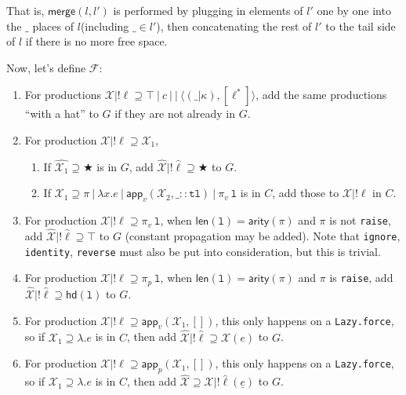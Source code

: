 \documentclass[a4paper]{article}
\newcommand*\vbar{|}
\begin{document}
That is, $\mathsf{merge}(l,l')$ is performed by plugging in elements of $l'$ one by one into the $\_$ places of $l$(including $\_\in l'$), then concatenating the rest of $l'$ to the tail side of $l$ if there is no more free space.

Now, let's define $\mathcal{F}$:

\begin{enumerate}
    \item For productions $\mathcal{X}\vbar!\ell\supseteq\top\:\vbar\: c\:\vbar\:\vbar\:\langle(\_\vbar\kappa),[\ell^*]\rangle$, add the same productions ``with a hat'' to $G$ if they are not already in $G$.
    \item For production $\mathcal{X}\vbar!\ell\supseteq\mathcal{X_1}$,
    \begin{enumerate}
        \item If $\hat{\mathcal{X_1}}\supseteq\bigstar$ is in $G$, add $\hat{\mathcal{X}}\vbar!\hat{\ell}\supseteq\bigstar$ to $G$.
        \item If $\mathcal{X}_1\supseteq \pi\:\vbar\:\lambda x.e\:\vbar\:\mathsf{app}_v(\mathcal{X}_2,\_::\mathtt{tl})\:\vbar\:\pi_v\:\mathtt{l}$ is in $C$, add those to $\mathcal{X}\vbar!\ell$ in $C$.
    \end{enumerate}
    \item For production $\mathcal{X}\vbar!\ell\supseteq\pi_v\:\mathtt{l}$, when $\mathsf{len}(\mathtt{l})=\mathsf{arity}(\pi)$ and $\pi$ is not \texttt{raise}, add $\hat{\mathcal{X}}\vbar!\hat{\ell}\supseteq\top$ to $G$ (constant propagation may be added). Note that \texttt{ignore}, \texttt{identity}, \texttt{reverse} must also be put into consideration, but this is trivial.
    \item For production $\mathcal{X}\vbar!\ell\supseteq\pi_p\:\mathtt{l}$, when $\mathsf{len}(\mathtt{l})=\mathsf{arity}(\pi)$ and $\pi$ is \texttt{raise}, add $\hat{\mathcal{X}}\vbar!\hat{\ell}\supseteq\mathsf{hd}(\mathtt{l})$ to $G$.
    \item For production $\mathcal{X}\vbar!\ell\supseteq\mathsf{app}_v(\mathcal{X_1},[])$, this only happens on a \texttt{Lazy.force}, so if $\mathcal{X_1}\supseteq\lambda.e$ is in $C$, then add $\hat{\mathcal{X}}\vbar!\hat{\ell}\supseteq\mathcal{X}(e)$ to $G$.
    \item For production $\mathcal{X}\vbar!\ell\supseteq\mathsf{app}_p(\mathcal{X_1},[])$, this only happens on a \texttt{Lazy.force}, so if $\mathcal{X_1}\supseteq\lambda.e$ is in $C$, then add $\hat{\mathcal{X}}\supseteq\mathcal{X}\vbar!\hat{\ell}(\underline{e})$ to $G$.

\end{enumerate}
\end{document}
